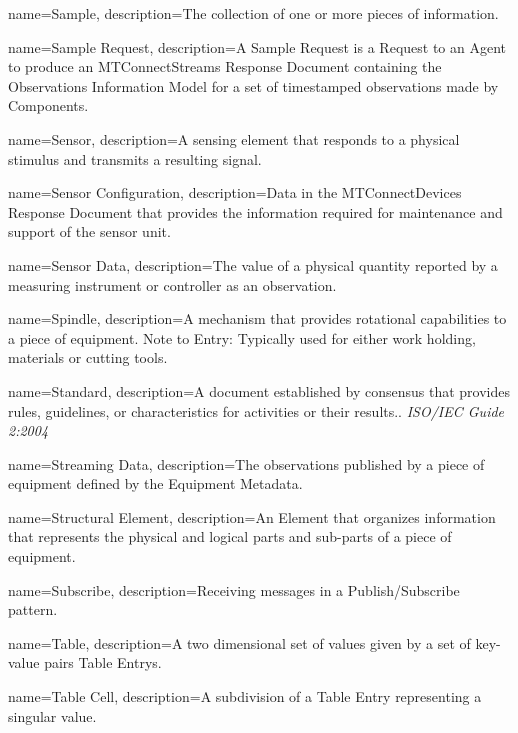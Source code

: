 {
    name={Sample},
	description={The collection of one or more pieces of information.  
}
}

{
    name={Sample Request},
	description={A \gls{Sample Request} is a \gls{Request} to an \gls{Agent} to produce an \gls{MTConnectStreams Response Document} containing the \gls{Observations Information Model} for a set of timestamped \glspl{observation} made by \glspl{Component}.}
}

{
    name={Sensor},
	description={A \gls{sensing element} that responds to a physical stimulus and transmits a resulting signal.}
}

{
    name={Sensor Configuration},
	description={Data in the \gls{MTConnectDevices Response Document} that provides the information required for maintenance and support of the \gls{sensor unit}.}
}

{
    name={Sensor Data},
	description={The value of a physical quantity reported by a measuring instrument or controller as an \gls{observation}.}
}

{
    name={Spindle},
	description={A mechanism that provides rotational capabilities to a piece of equipment. 
Note to Entry: Typically used for either work holding, materials or cutting tools.}
}

{
    name={Standard},
	description={A document established by consensus that provides rules, guidelines, or characteristics for activities or their results.. \textit{ISO/IEC Guide 2:2004}}
}

{
    name={Streaming Data},
	description={The \glspl{observation} published by a piece of equipment defined by the \gls{Equipment Metadata}.}
}

{
    name={Structural Element},
	description={An \gls{Element} that organizes information that represents the physical and logical parts and sub-parts of a piece of equipment.}
}

{
    name={Subscribe},
	description={Receiving messages in a \gls{Publish/Subscribe} pattern.}
}

{
    name={Table},
	description={A two dimensional set of values given by a set of \glspl{key-value pair} \glspl{Table Entry}. }
}

{
    name={Table Cell},
	description={A subdivision of a \gls{Table Entry} representing a singular value.}
}


